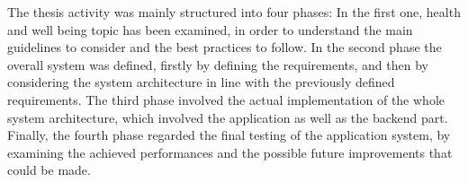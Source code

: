 \noindent The thesis activity was mainly structured into four phases: In the first one, health and well being topic has been examined, in order to understand the main guidelines to consider and the best practices to follow. In the second phase the overall system was defined, firstly by defining the requirements, and then by considering the system architecture in line with the previously defined requirements. The third phase involved the actual implementation of the whole system architecture, which involved the application as well as the backend part. Finally, the fourth phase regarded the final testing of the application system, by examining the achieved performances and the possible future improvements that could be made.